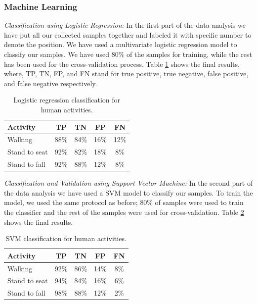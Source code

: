 \documentclass[letterpaper]{article}
\begin{document}
\begin{sloppy}
\subsubsection{Machine Learning\\}
\emph{Classification using Logistic Regression:}
In the first part of the data analysis we have put all our collected samples together and labeled it
with specific number to denote the position. We have used a multivariate logistic regression model to
classify our samples. We have used 80\% of the samples for training, while the rest has been used
for the cross-validation process. Table \ref{tab:human-logistic-class} shows the final results, where, TP, TN, 
FP, and FN stand for true positive, true negative, false positive, and false negative respectively. 

\begin{table}[!ht]
\caption{Logistic regression classification for human activities.}
	\label{tab:human-logistic-class}
	\centering
		\begin{tabular} {|l |c |c |c|c|}
			\hline
			{\bf Activity} & {\bf  TP}  &	{\bf TN}  &	{\bf FP} &	{\bf FN} \\ 
			\hline
			Walking	& 88\%	& 84\%	& 16\%	& 12\% \\ \hline
			Stand to seat	& 92\%	& 82\%	& 18\% & 	8\%	 \\ \hline 
			Stand to fall	& 92\%	& 88\%	& 12\%	& 8\%	 \\ \hline
		\end{tabular}
\end{table}

\noindent\emph{Classification and Validation using Support Vector Machine:}
In the second part of the data analysis we have used a SVM model
to classify our samples. To train the model, we used the same protocol as before; 80\% of
samples were used to train the classifier and the rest of the  samples were used for 
cross-validation. Table \ref{tab:human-svm-class} shows the final results.

\begin{table}[!ht]
\caption{SVM classification for human activities.}
	\label{tab:human-svm-class}
	\centering
		\begin{tabular} {|l |c |c |c|c|}
			\hline
			{\bf Activity} & {\bf  TP}  &	{\bf TN}  &	{\bf FP} &	{\bf FN} \\ 
			\hline
			Walking	& 92\%	& 86\%	& 14\%	& 8\% \\ \hline
			Stand to seat	& 94\%	& 84\%	& 16\% & 	6\%	 \\ \hline 
			Stand to fall	& 98\%	& 88\%	& 12\%	& 2\%	 \\ \hline
		\end{tabular}
\end{table}


\end{sloppy}
\end{document}
